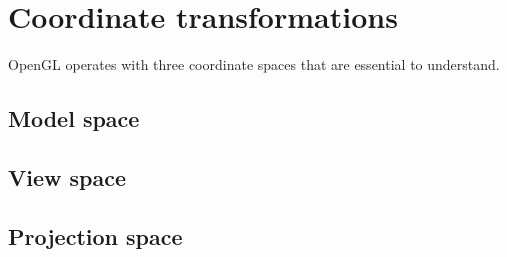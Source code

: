 \section{Coordinate transformations}
\label{sec:opengl_coordinate_transformations}
OpenGL operates with three coordinate spaces that are essential to understand. 
\subsection{Model space}
\subsection{View space}
\subsection{Projection space}